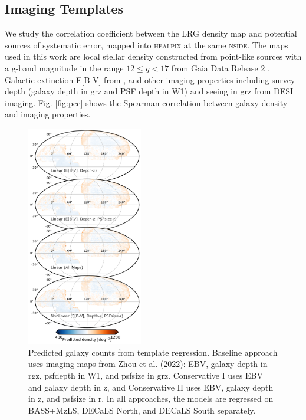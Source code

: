 \subsection{Imaging Templates}
We study the correlation coefficient between the LRG density map and potential sources of systematic error, mapped into \textsc{healpix} at the same \textsc{nside}. The maps used in this work are local stellar density constructed from point-like sources with a g-band magnitude in the range $12 \leq g < 17$ from Gaia Data Release 2 \citep[see,][]{gaiadr2, myers2022},  Galactic extinction E[B-V] from \cite{schlegel1998maps}, and other imaging properties including survey depth (galaxy depth in grz and PSF depth in W1) and seeing in grz from DESI imaging. Fig. \ref{fig:pcc} shows the Spearman correlation between galaxy density and imaging properties.

\begin{figure}
    \centering
    \includegraphics[width=0.45\textwidth]{figures/npred.pdf}
    \caption{Predicted galaxy counts from template regression. Baseline approach uses imaging maps from Zhou et al. (2022): EBV, galaxy depth in rgz, psfdepth in W1, and psfsize in grz. Conservative I uses EBV and galaxy depth in z, and Conservative II uses EBV, galaxy depth in z, and psfsize in r. In all approaches, the models are regressed on BASS+MzLS, DECaLS North, and DECaLS South separately.}
    \label{fig:npred}
\end{figure}

